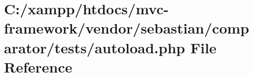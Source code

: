 \hypertarget{sebastian_2comparator_2tests_2autoload_8php}{}\section{C\+:/xampp/htdocs/mvc-\/framework/vendor/sebastian/comparator/tests/autoload.php File Reference}
\label{sebastian_2comparator_2tests_2autoload_8php}
